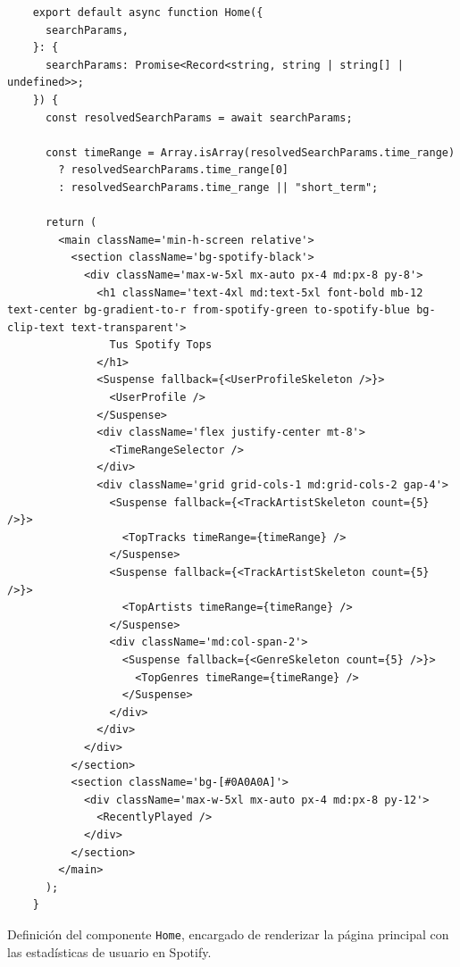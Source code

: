 \begin{ifalgorithm}[H]
  \begin{lstlisting}
    export default async function Home({
      searchParams,
    }: {
      searchParams: Promise<Record<string, string | string[] | undefined>>;
    }) {
      const resolvedSearchParams = await searchParams;

      const timeRange = Array.isArray(resolvedSearchParams.time_range)
        ? resolvedSearchParams.time_range[0]
        : resolvedSearchParams.time_range || "short_term";

      return (
        <main className='min-h-screen relative'>
          <section className='bg-spotify-black'>
            <div className='max-w-5xl mx-auto px-4 md:px-8 py-8'>
              <h1 className='text-4xl md:text-5xl font-bold mb-12 text-center bg-gradient-to-r from-spotify-green to-spotify-blue bg-clip-text text-transparent'>
                Tus Spotify Tops
              </h1>
              <Suspense fallback={<UserProfileSkeleton />}>
                <UserProfile />
              </Suspense>
              <div className='flex justify-center mt-8'>
                <TimeRangeSelector />
              </div>
              <div className='grid grid-cols-1 md:grid-cols-2 gap-4'>
                <Suspense fallback={<TrackArtistSkeleton count={5} />}>
                  <TopTracks timeRange={timeRange} />
                </Suspense>
                <Suspense fallback={<TrackArtistSkeleton count={5} />}>
                  <TopArtists timeRange={timeRange} />
                </Suspense>
                <div className='md:col-span-2'>
                  <Suspense fallback={<GenreSkeleton count={5} />}>
                    <TopGenres timeRange={timeRange} />
                  </Suspense>
                </div>
              </div>
            </div>
          </section>
          <section className='bg-[#0A0A0A]'>
            <div className='max-w-5xl mx-auto px-4 md:px-8 py-12'>
              <RecentlyPlayed />
            </div>
          </section>
        </main>
      );
    }
    \end{lstlisting}
  \caption{Definición del componente \texttt{Home}, encargado de renderizar la página principal con las estadísticas de usuario en Spotify.}
  \label{alg:home_component}
\end{ifalgorithm}


